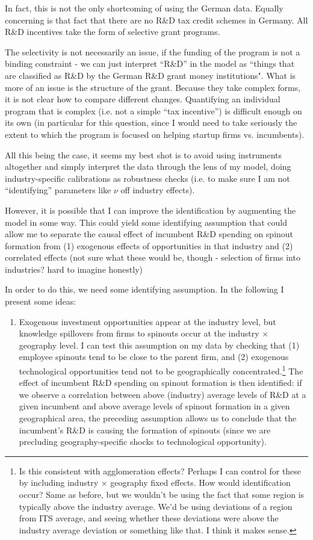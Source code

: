 \documentclass[12pt,english]{article}
\theoremstyle{remark}
\begin{document}
In fact, this is not the only shortcoming of using the German data. Equally concerning is that fact that there are no R\&D tax credit schemes in Germany. All R\&D incentives take the form of selective grant programs. 

The selectivity is not necessarily an issue, if the funding of the program is not a binding constraint - we can just interpret ``R\&D'' in the model as ``things that are classified as R\&D by the German R\&D grant money institutions". What is more of an issue is the structure of the grant. Because they take complex forms, it is not clear how to compare different changes. Quantifying an individual program that is complex (i.e. not a simple ``tax incentive'') is difficult enough on its own (in particular for this question, since I would need to take seriously the extent to which the program is focused on helping startup firms vs. incumbents).


All this being the case, it seems my best shot is to avoid using instruments altogether and simply interpret the data through the lens of my model, doing industry-specific calibrations as robustness checks (i.e. to make sure I am not ``identifying'' parameters like $\nu$ off industry effects). 

However, it is possible that I can improve the identification by augmenting the model in some way. This could yield some identifying assumption that could allow me to separate the causal effect of incumbent R\&D spending on spinout formation from (1) exogenous effects of opportunities in that industry and (2) correlated effects (not sure what these would be, though - selection of firms into industries? hard to imagine honestly)

In order to do this, we need some identifying assumption. In the following I present some ideas:
\begin{enumerate}
	\item Exogenous investment opportunities appear at the industry level, but knowledge spillovers from firms to spinouts occur at the industry $\times$ geography level. I can test this assumption on my data by checking that (1) employee spinouts tend to be close to the parent firm, and (2) exogenous technological opportunities tend not to be geographically concentrated.\footnote{Is this consistent with agglomeration effects? Perhaps I can control for these by including industry $\times$ geography fixed effects. How would identification occur? Same as before, but we wouldn't be using the fact that some region is typically above the industry average. We'd be using deviations of a region from ITS average, and seeing whether these deviations were above the industry average deviation or something like that. I think it makes sense.} The effect of incumbent R\&D spending on spinout formation is then identified: if we observe a correlation between above (industry) average levels of R\&D at a given incumbent and above average levels of spinout formation in a given geographical area, the preceding assumption allows us to conclude that the incumbent's R\&D is causing the formation of spinouts (since we are precluding geography-specific shocks to technological opportunity).
\end{enumerate}
\end{document}
